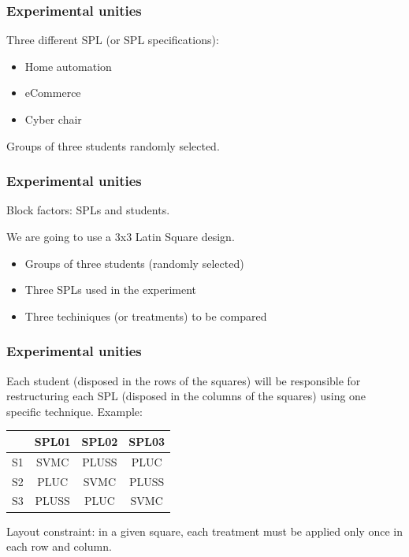 \documentclass{beamer}
\begin{document}
\begin{frame}
\frametitle{Experimental unities}

Three different SPL (or SPL specifications):

\begin{itemize}
  \item Home automation
  \item eCommerce
  \item Cyber chair
\end{itemize}

Groups of three students randomly selected.

\end{frame}


\begin{frame}
\frametitle{Experimental unities}

\alert{Block factors:} SPLs and students.

We are going to use a \alert{3x3} Latin Square design. 

\begin{itemize}
  \item Groups of \alert{three students} (randomly selected)
  \item \alert{Three SPLs} used in the experiment
  \item Three techiniques (or treatments) to be compared
\end{itemize}

\end{frame}

\begin{frame}
\frametitle{Experimental unities}

Each student (disposed in the rows of the squares) will be responsible for
restructuring each SPL (disposed in the columns of the squares) using one
specific technique. Example:

\begin{center}
\small{
\begin{tabular}{l||c|c|c}
 		& 	SPL01 	& 	SPL02 	&  SPL03 		\\ \hline \hline
 S1   	&	SVMC    &  	PLUSS   &  PLUC		\\ \hline
 S2   	&	PLUC    &   SVMC   	&  PLUSS	\\ \hline	
 S3   	&	PLUSS   &   PLUC  	&  SVMC		\\ \hline
\end{tabular}
}
\end{center}

\alert{Layout constraint:} in a given square, each treatment must be applied
only once in each row and column.

\end{frame} 
\end{document}
